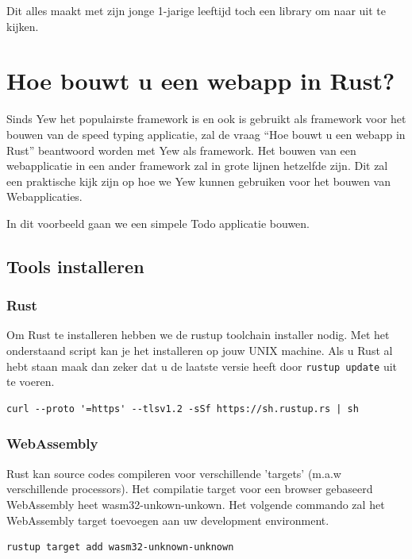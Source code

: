 Dit alles maakt met zijn jonge 1-jarige leeftijd toch een library om naar uit te kijken. 

\clearpage

\section{Hoe bouwt u een webapp in Rust?}

Sinds Yew het populairste framework is en ook is gebruikt als framework voor het bouwen van de speed
typing applicatie, zal de vraag \enquote{Hoe bouwt u een webapp in Rust} beantwoord worden met Yew
als framework. Het bouwen van een webapplicatie in een ander framework zal in grote lijnen hetzelfde
zijn. Dit zal een praktische kijk zijn op hoe we Yew kunnen gebruiken voor het bouwen van
Webapplicaties. \cite{yew_introduction}

In dit voorbeeld gaan we een simpele Todo applicatie bouwen.

\subsection{Tools installeren}

\subsubsection{Rust}
Om Rust te installeren hebben we de rustup toolchain installer nodig. Met het onderstaand script kan
je het installeren op jouw UNIX machine. Als u Rust al hebt staan maak dan zeker dat u de laatste
versie heeft door \texttt{rustup update} uit te voeren.

\begin{verbatim}
curl --proto '=https' --tlsv1.2 -sSf https://sh.rustup.rs | sh
\end{verbatim}

\subsubsection{WebAssembly}

Rust kan source codes compileren voor verschillende 'targets' (m.a.w verschillende processors). Het
compilatie target voor een browser gebaseerd WebAssembly heet wasm32-unkown-unkown. Het volgende
commando zal het WebAssembly target toevoegen aan uw development environment.

\begin{verbatim}
rustup target add wasm32-unknown-unknown
\end{verbatim}

